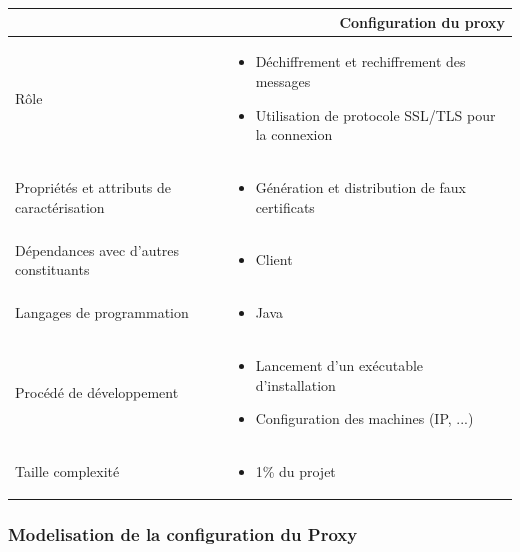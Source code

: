 \documentclass[a4paper,11pt,french]{article}
\begin{document}
\begin{center}
        \vspace*{0.7cm}
        \begin{tabularx}{16cm}{|l|X|}
        \hline
        \multicolumn{2}{|r|}{\textbf{Configuration du proxy}}\\
        \hline
        R\^ole &  \begin{itemize}\item Déchiffrement et rechiffrement des messages
        \item Utilisation de protocole SSL/TLS pour la connexion \end{itemize}\\
        \hline
        Propriétés et attributs de caractérisation & \begin{itemize} \item Génération et distribution de faux certificats \end{itemize}\\
        \hline
        Dépendances avec d'autres constituants & \begin{itemize}\item Client \end{itemize}\\
        \hline
        Langages de programmation & \begin{itemize} \item Java \end{itemize}\\
        \hline
        Procédé de développement & \begin{itemize}\item Lancement d'un exécutable d'installation \item Configuration des machines (IP, ...) \end{itemize}\\
        \hline
        Taille complexité & \begin{itemize}\item 1\% du projet\end{itemize}\\
        \hline
        \end{tabularx}
\end{center}

\subsubsection{Modelisation de la configuration du Proxy}
\end{document}
